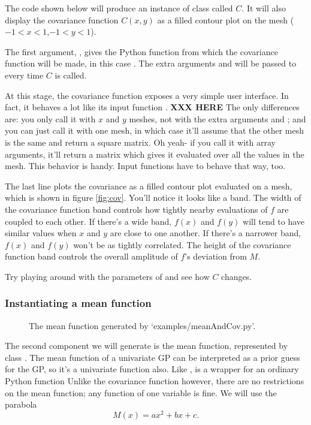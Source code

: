 \documentclass{manual}
\begin{document}
The code shown below will produce an instance of class  called $C$. It will also display the covariance function $C(x,y)$ as a filled contour plot on the mesh ($-1<x<1$,$-1<y<1$).


The first argument, , gives the Python function from which the covariance function will be made, in this case . The extra arguments  and  will be passed to  every time $C$ is called.

At this stage, the covariance function exposes a very simple user interface. In fact, it behaves a lot like its input function . \textbf{XXX HERE} The only differences are: you only call it with $x$ and $y$ meshes, not with the extra arguments  and ; and you can just call it with one mesh, in which case it'll assume that the other mesh is the same and return a square matrix. Oh yeah- if you call it with array arguments, it'll return a matrix which gives it evaluated over all the values in the mesh. This behavior is handy. Input functions have to behave that way, too.

The last line plots the covariance as a filled contour plot evaluated on a mesh, which is shown in figure \ref{fig:cov}. You'll notice it looks like a band. The width of the covariance function band controls how tightly nearby evaluations of $f$ are coupled to each other. If there's a wide band, $f(x)$ and $f(y)$ will tend to have similar values when $x$ and $y$ are close to one another. If there's a narrower band, $f(x)$ and $f(y)$ won't be as tightly correlated. The height of the covariance function band controls the overall amplitude of $f$'s deviation from $M$. 

Try playing around with the parameters of  and see how $C$ changes.

\subsubsection{Instantiating a mean function}\label{subsub:mean}

\begin{figure}
	\centering
	\caption{The mean function generated by {\sffamily `examples/meanAndCov.py'}.}
	\label{fig:mean}
\end{figure}

The second component we will generate is the mean function, represented by class . The mean function of a univariate GP can be interpreted as a prior guess for the GP, so it's a univariate function also. Like ,  is a wrapper for an ordinary Python function Unlike the covariance function however, there are no restrictions on the mean function; any function of one variable is fine. We will use the parabola
\begin{equation}
	M(x) = ax^2 + bx + c.
\end{equation}
\end{document}
